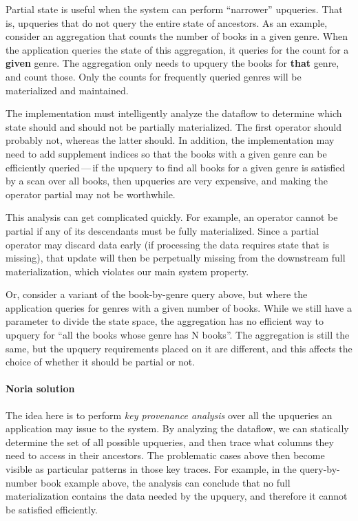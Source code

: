 \documentclass[fontsize=12pt,paper=letter]{scrartcl}
\begin{document}
Partial state is useful when the system can perform ``narrower'' upqueries.
That is, upqueries that do not query the entire state of ancestors. As
an example, consider an aggregation that counts the number of books in a
given genre. When the application queries the state of this aggregation,
it queries for the count for a \textbf{given} genre. The aggregation only
needs to upquery the books for \textbf{that} genre, and count those. Only the
counts for frequently queried genres will be materialized and
maintained.

The implementation must intelligently analyze the dataflow to determine
which state should and should not be partially materialized. The first
operator should probably not, whereas the latter should. In addition,
the implementation may need to add supplement indices so that the books
with a given genre can be efficiently queried\,---\,if the upquery to find
all books for a given genre is satisfied by a scan over all books, then
upqueries are very expensive, and making the operator partial may not be
worthwhile.

This analysis can get complicated quickly. For example, an operator
cannot be partial if any of its descendants must be fully materialized.
Since a partial operator may discard data early (if processing the data
requires state that is missing), that update will then be perpetually
missing from the downstream full materialization, which violates our
main system property.

Or, consider a variant of the book-by-genre query above, but where the
application queries for genres with a given number of books. While we
still have a parameter to divide the state space, the aggregation has no
efficient way to upquery for ``all the books whose genre has N books''.
The aggregation is still the same, but the upquery requirements placed
on it are different, and this affects the choice of whether it should be
partial or not.

\paragraph{Noria solution}
The idea here is to perform \emph{key provenance analysis} over all the
upqueries an application may issue to the system. By analyzing the dataflow, we
can statically determine the set of all possible upqueries, and then trace what
columns they need to access in their ancestors. The problematic cases above then
become visible as particular patterns in those key traces. For example, in the
query-by-number book example above, the analysis can conclude that no full
materialization contains the data needed by the upquery, and therefore it cannot
be satisfied efficiently.
\end{document}
